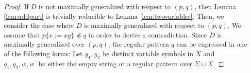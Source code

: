   \begin{proof}
 {\color{red} If $D$ is not maximally generalized with respect to $(p,q)$, then Lemma \ref{lem:addpart} is trivially reducible to Lemma \ref{lem:twovariables}.
 Then, we consider the case where $D$ is maximally generalized with respect to $(p,q)$.
 We assume that $p \{ x := xy \} \not\preceq q$ in order to derive a contradiction.}
%
%
%
%
Since $D$ is maximally generalized {\color{red}over} $(p,q)$, the regular pattern $q$ can be expressed in one of the following forms: Let $y_{1}, y_{2}$ be distinct variable symbols in $X$ and $q_{1}, q_{2}, w, w^{\prime}$ be either the empty string or a regular pattern {\color{red}over} $\Sigma\cup X$.


\end{proof}
